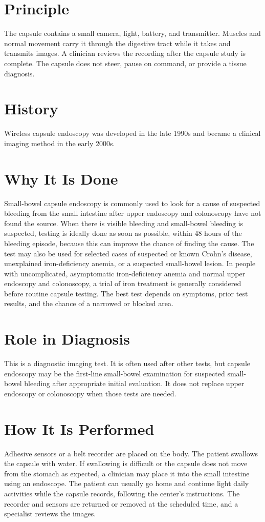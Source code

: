 \section*{Principle}
The capsule contains a small camera, light, battery, and transmitter. Muscles and normal movement carry it through the digestive tract while it takes and transmits images. A clinician reviews the recording after the capsule study is complete. The capsule does not steer, pause on command, or provide a tissue diagnosis.

\section*{History}
Wireless capsule endoscopy was developed in the late 1990s and became a clinical imaging method in the early 2000s.

\section*{Why It Is Done}
Small-bowel capsule endoscopy is commonly used to look for a cause of suspected bleeding from the small intestine after upper endoscopy and colonoscopy have not found the source. When there is visible bleeding and small-bowel bleeding is suspected, testing is ideally done as soon as possible, within 48 hours of the bleeding episode, because this can improve the chance of finding the cause. The test may also be used for selected cases of suspected or known Crohn's disease, unexplained iron-deficiency anemia, or a suspected small-bowel lesion. In people with uncomplicated, asymptomatic iron-deficiency anemia and normal upper endoscopy and colonoscopy, a trial of iron treatment is generally considered before routine capsule testing. The best test depends on symptoms, prior test results, and the chance of a narrowed or blocked area.

\section*{Role in Diagnosis}
This is a diagnostic imaging test. It is often used after other tests, but capsule endoscopy may be the first-line small-bowel examination for suspected small-bowel bleeding after appropriate initial evaluation. It does not replace upper endoscopy or colonoscopy when those tests are needed.

\section*{How It Is Performed}
Adhesive sensors or a belt recorder are placed on the body. The patient swallows the capsule with water. If swallowing is difficult or the capsule does not move from the stomach as expected, a clinician may place it into the small intestine using an endoscope. The patient can usually go home and continue light daily activities while the capsule records, following the center's instructions. The recorder and sensors are returned or removed at the scheduled time, and a specialist reviews the images.

